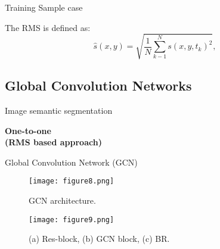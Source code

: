 \documentclass[10pt,aspectratio=169]{beamer} %
\begin{document}
\setcounter{subfigure}{0}
\begin{frame}{Training Sample case}
	\begin{figure}
		\centering		
		\qquad
		\qquad
	\end{figure}
The RMS is defined as:
\begin{equation}
	\hat{s}(x,y) = \sqrt{\frac{1}{N}\sum_{k-1}^{N}s(x,y,t_k)^2}, 
	\label{eqn:rms} 
\end{equation}
\end{frame}


\subsection{Global Convolution Networks}
\setcounter{subfigure}{0}
\begin{frame}{Image semantic segmentation}
	\begin{minipage}[l]{0.35\textwidth}
		\textbf{One-to-one \\(RMS based approach)}
	\end{minipage}
	\begin{minipage}[l]{0.6\textwidth}
		\begin{figure}
			\centering
			\qquad
			\qquad
		\end{figure}
	\end{minipage}	
\end{frame}


\setcounter{subfigure}{0}
\begin{frame}{Global Convolution Network (GCN)}
	\begin{minipage}[ht]{0.5\textwidth}
		\begin{figure}
			\texttt{[image: figure8.png]} 
			\caption{GCN architecture.}
		\end{figure}
	
		\end{minipage}
		\begin{minipage}[c]{0.45\textwidth}
			\begin{figure}[c]
				\centering
				\texttt{[image: figure9.png]}
				\caption{(a) Res-block, (b) GCN block, (c) BR.}
			\end{figure}
	\end{minipage}
\end{frame}
\end{document}
